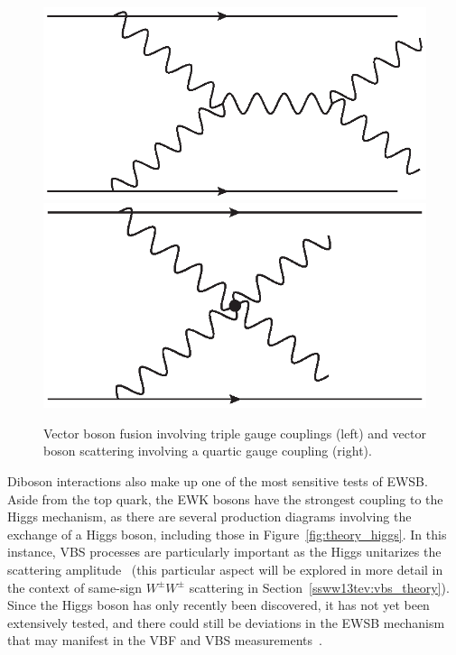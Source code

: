 \begin{figure}[htbp]
  \centering
  \includegraphics[height=.13\textheight]{figs/theory/vbf}\hspace{20pt}
  \includegraphics[height=.13\textheight]{figs/theory/vbs}
  \caption{Vector boson fusion involving triple gauge couplings (left) and vector boson scattering involving a quartic gauge coupling (right).}
  \label{fig:theory_vbf_vbs}
\end{figure}

Diboson interactions also make up one of the most sensitive tests of EWSB.
Aside from the top quark, the EWK bosons have the strongest coupling to the Higgs mechanism, as there are several production diagrams involving the exchange of a Higgs boson, including those in Figure~\ref{fig:theory_higgs}.
In this instance, VBS processes are particularly important as the Higgs unitarizes the scattering amplitude~\cite{1977.ben-lee-weak-interactions-physrevd} (this particular aspect will be explored in more detail in the context of same-sign $W^{\pm}W^{\pm}$ scattering in Section~\ref{ssww13tev:vbs_theory}).
Since the Higgs boson has only recently been discovered, it has not yet been extensively tested, and there could still be deviations in the EWSB mechanism that may manifest in the VBF and VBS measurements~\cite{2017.multiboson-at-lhc}.


